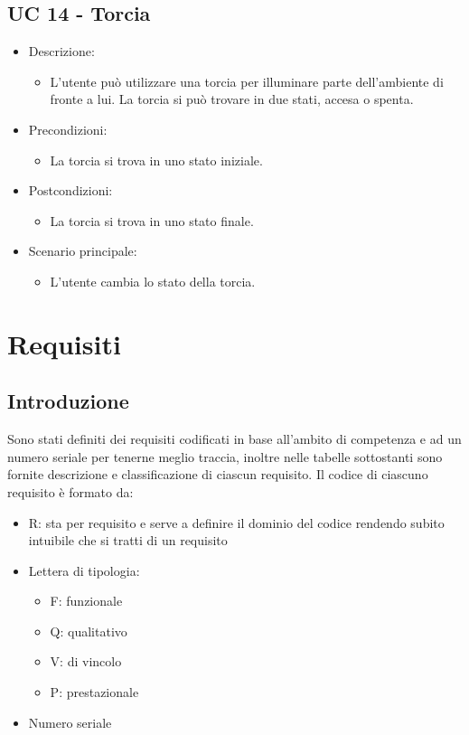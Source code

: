 \subsection{UC 14 - Torcia}
\begin{itemize}

	\item Descrizione:
	\begin{itemize}
		\item L'utente può utilizzare una torcia per illuminare parte dell'ambiente di fronte a lui. \newline La torcia si può trovare in due stati, accesa o spenta.
	\end{itemize}
	
	\item Precondizioni:
	\begin{itemize}
		\item La torcia si trova in uno stato iniziale.
	\end{itemize}
	
	\item Postcondizioni:
	\begin{itemize}
		\item La torcia si trova in uno stato finale.
	\end{itemize}
	
	\item Scenario principale:
	\begin{itemize}
		\item L'utente cambia lo stato della torcia.
	\end{itemize}
	
\end{itemize}

\section{Requisiti}

\subsection{Introduzione}
Sono stati definiti dei requisiti codificati in base all'ambito di competenza e ad un numero seriale per tenerne meglio traccia, inoltre nelle tabelle sottostanti sono fornite descrizione e classificazione di ciascun requisito.
\tabularnewline
Il codice di ciascuno requisito è formato da:
\begin{itemize}
	\item R: sta per requisito e serve a definire il dominio del codice rendendo subito intuibile che si tratti di un requisito
	\item Lettera di tipologia:
	\begin{itemize}
		\item F: funzionale
		\item Q: qualitativo
		\item V: di vincolo
		\item P: prestazionale
	\end{itemize}
	\item Numero seriale
\end{itemize}

